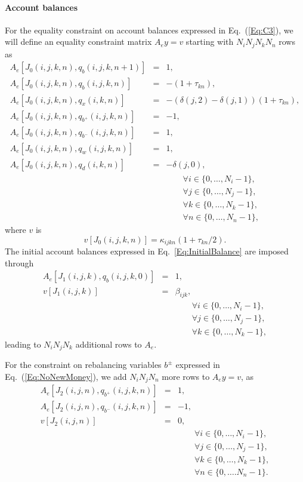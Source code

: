 \documentclass{article}[fleqn,12pt]
\begin{document}
\paragraph*{Account balances}
For the equality constraint on account balances expressed in Eq.~(\ref{Eq:C3}),
we will define an equality constraint matrix $A_ey = v$ starting
with $N_iN_jN_kN_n$ rows as
\begin{eqnarray}
	\label{Eq:B1}
	A_e[J_0(i, j, k, n), q_b(i, j, k, n+1)] &=& 1, \nonumber \\
	A_e[J_0(i, j, k, n), q_b(i, j, k, n)] &=& -(1 + \tau_{kn}), \nonumber \\
	A_e[J_0(i, j, k, n), q_x(i, k, n)] &=& -(\delta(j, 2) - \delta(j, 1))(1 + \tau_{kn}), \nonumber \\
	A_e[J_0(i, j, k, n), q_{b^+}(i, j, k, n)] &=& -1, \nonumber \\
	A_e[J_0(i, j, k, n), q_{b^-}(i, j, k, n)] &=&  1, \nonumber \\
	A_e[J_0(i, j, k, n), q_w(i, j, k, n)] &=& 1, \nonumber \\
	A_e[J_0(i, j, k, n), q_d(i, k, n)] &=& -\delta(j, 0), \\
	&&\qquad\forall i \in \{0,\ldots, N_i-1\},\nonumber\\
	&&\qquad\forall j \in \{0,\ldots, N_j-1\},\nonumber\\
	&&\qquad\forall k \in \{0,\ldots, N_k-1\},\nonumber\\
	&&\qquad\forall n \in \{0,\ldots, N_n-1\}, \nonumber
\end{eqnarray}
where $v$ is
\begin{equation}
	v[J_0(i, j, k, n)] = \kappa_{ijkn}(1 + \tau_{kn}/2).
\end{equation}
The initial account balances expressed in Eq.~\ref{Eq:InitialBalance} are imposed through
\begin{eqnarray}
	A_e[J_1(i, j, k), q_b(i, j, k, 0)] &=& 1, \nonumber \\
	v[J_1(i, j, k)] &=& \beta_{ijk},  \\
	&&\qquad\forall i \in \{0,\ldots, N_i-1\},\nonumber\\
	&&\qquad\forall j \in \{0,\ldots, N_j-1\},\nonumber\\
	&&\qquad\forall k \in \{0,\ldots, N_k-1\},\nonumber
\end{eqnarray}
leading to $N_i N_j N_k$ additional rows to $A_e$.

For the constraint on rebalancing variables  $b^\pm$ expressed in Eq.~(\ref{Eq:NoNewMoney}),
we add $N_iN_jN_n$ more rows to $A_ey = v$, as
\begin{eqnarray}
	A_e[J_2(i, j, n), q_{b^+}(i, j, k, n)] &=& 1, \nonumber \\
	A_e[J_2(i, j, n), q_{b^-}(i, j, k, n)] &=& -1, \nonumber \\
	v[J_2(i, j, n)] &=& 0, \\
	&&\qquad\forall i \in \{0,\ldots, N_i-1\},\nonumber\\
	&&\qquad\forall j \in \{0,\ldots, N_j-1\},\nonumber\\
	&&\qquad\forall k \in \{0,\ldots, N_k-1\},\nonumber\\
	&&\qquad\forall n \in \{0,\ldots. N_n-1\}. \nonumber
\end{eqnarray}
\end{document}
